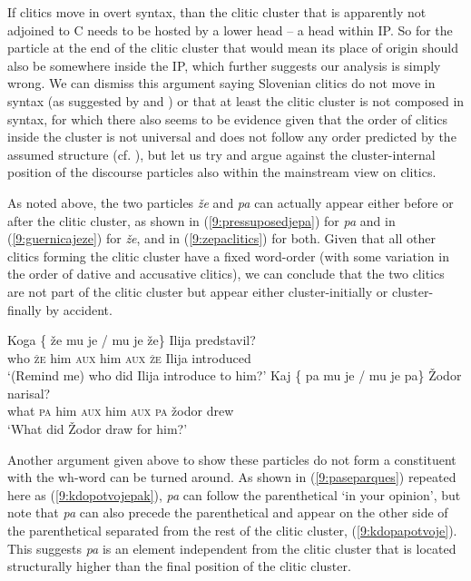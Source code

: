 \documentclass[output=paper,modfonts,newtxmath,hidelinks]{langscibook}
\begin{document}
\noindent If clitics move in overt syntax, than the clitic cluster that is apparently not adjoined to C needs to be hosted by a lower head -- a head within IP. So for the particle at the end of the clitic cluster that would mean its place of origin should also be somewhere inside the IP, which  further suggests our analysis is simply wrong. We can dismiss this argument saying Slovenian clitics do not move in syntax (as suggested by \citealt{marusic2008clitics} and \citealt{marusiczaucer2017brno}) or that at least the clitic cluster is not composed in syntax, for which there also seems to be evidence given that the order of clitics inside the cluster is not universal and does not follow any order predicted by the assumed structure (cf. \citealt{marusiclecturenotes}), but let us try and argue against the cluster-internal position of the discourse particles also within the mainstream view on clitics. 

As noted above, the two particles \textit{že} and \textit{pa} can actually appear either before or after the clitic cluster, as shown in (\ref{9:pressuposedjepa}) for \textit{pa} and in (\ref{9:guernicajeze}) for \textit{že}, and in (\ref{9:zepaclitics}) for both. Given that all other clitics forming the clitic cluster have a fixed word-order (with some variation in the order of dative and accusative clitics), we can conclude that the two clitics are not part of the clitic cluster but appear either cluster-initially or cluster-finally by accident.

\begin{exe}
\ex \label{9:zepaclitics}
\begin{xlist}
\ex \gll 
Koga \{\hspace{-2pt} že mu je / mu je že\} Ilija predstavil?\\
who {} \textsc{že} him \textsc{aux} {} him \textsc{aux} \textsc{že} Ilija introduced\\
\trans 	 `(Remind me) who did Ilija introduce to him?'
\ex	\gll Kaj \{\hspace{-2pt} pa mu je / mu je pa\} Žodor narisal?\\
 		what {} \textsc{pa} him \textsc{aux} {} him \textsc{aux} \textsc{pa} žodor drew\\
\trans 	 `What did Žodor draw for him?'
\end{xlist}
\end{exe}

\noindent Another argument given above to show these particles do not form a constituent with the wh-word can be turned around. As shown in (\ref{9:paseparques}) repeated here as (\ref{9:kdopotvojepak}), \textit{pa} can follow the parenthetical `in your opinion', but note that \textit{pa} can also precede the parenthetical and appear on the other side of the parenthetical separated from the rest of the clitic cluster, (\ref{9:kdopapotvoje}). This suggests \textit{pa} is an element independent from the clitic cluster that is located structurally higher than the final position of the clitic cluster.
\end{document}

